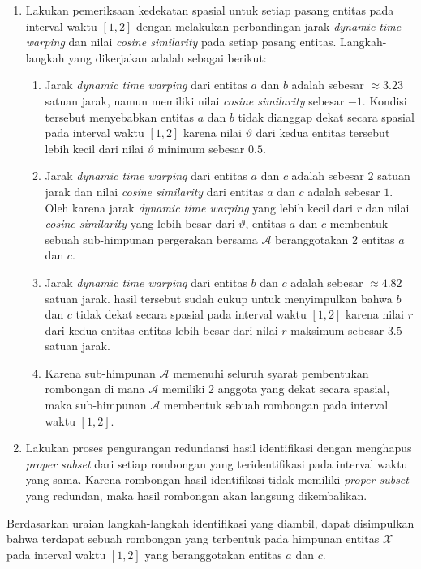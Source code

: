 \begin{enumerate}
    \item Lakukan pemeriksaan kedekatan spasial untuk setiap pasang entitas pada interval waktu $[1, 2]$ dengan melakukan perbandingan jarak \textit{dynamic time warping} dan nilai \textit{cosine similarity} pada setiap pasang entitas. Langkah-langkah yang dikerjakan adalah sebagai berikut: 
    
    \begin{enumerate}
        \item Jarak \textit{dynamic time warping} dari entitas $a$ dan $b$ adalah sebesar $\approx 3.23$ satuan jarak, namun memiliki nilai \textit{cosine similarity} sebesar $-1$. Kondisi tersebut menyebabkan entitas $a$ dan $b$ tidak dianggap dekat secara spasial pada interval waktu $[1, 2]$ karena nilai $\vartheta$ dari kedua entitas tersebut lebih kecil dari nilai $\vartheta$ minimum sebesar $0.5$.
        \item Jarak \textit{dynamic time warping} dari entitas $a$ dan $c$ adalah sebesar $2$ satuan jarak dan nilai \textit{cosine similarity} dari entitas $a$ dan $c$ adalah sebesar $1$. Oleh karena jarak \textit{dynamic time warping} yang lebih kecil dari $r$ dan nilai \textit{cosine similarity} yang lebih besar dari $\vartheta$, entitas $a$ dan $c$ membentuk sebuah sub-himpunan pergerakan bersama $\mathcal{A}$ beranggotakan 2 entitas $a$ dan $c$.
        \item Jarak \textit{dynamic time warping} dari entitas $b$ dan $c$ adalah sebesar $\approx 4.82$ satuan jarak. hasil tersebut sudah cukup untuk menyimpulkan bahwa $b$ dan $c$ tidak dekat secara spasial pada interval waktu $[1, 2]$ karena nilai $r$ dari kedua entitas entitas lebih besar dari nilai $r$ maksimum sebesar $3.5$ satuan jarak.
        \item Karena sub-himpunan $\mathcal{A}$ memenuhi seluruh syarat pembentukan rombongan di mana $\mathcal{A}$ memiliki 2 anggota yang dekat secara spasial, maka sub-himpunan $\mathcal{A}$ membentuk sebuah rombongan pada interval waktu $[1, 2]$.
    \end{enumerate}
    
    \item Lakukan proses pengurangan redundansi hasil identifikasi dengan menghapus \textit{proper subset} dari setiap rombongan yang teridentifikasi pada interval waktu yang sama. Karena rombongan hasil identifikasi tidak memiliki \textit{proper subset} yang redundan, maka hasil rombongan akan langsung dikembalikan.
\end{enumerate}

Berdasarkan uraian langkah-langkah identifikasi yang diambil, dapat disimpulkan bahwa terdapat sebuah rombongan yang terbentuk pada himpunan entitas $\mathcal{X}$ pada interval waktu $[1, 2]$ yang beranggotakan entitas $a$ dan $c$.
